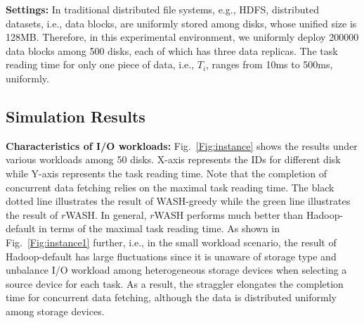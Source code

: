\documentclass[conference]{IEEEtran}
\begin{document}

\textbf{Settings:}
In traditional distributed file systems, e.g., HDFS\cite{b19}, distributed datasets, i.e., data blocks, are uniformly stored among disks, whose unified size is 128MB. Therefore, in this experimental environment, we uniformly deploy 200000 data blocks among 500 disks, each of which has three data replicas. The task reading time for only one piece of data, i.e., $T_i$, ranges from 10ms to 500ms, uniformly. 



\subsection{Simulation Results}

\textbf{Characteristics of I/O workloads:} Fig.~\ref{Fig:instance} shows the results under various workloads among 50 disks. X-axis represents the IDs for different disk while Y-axis represents the task reading time. Note that the completion of concurrent data fetching relies on the maximal task reading time. The black dotted line illustrates the result of WASH-greedy while the green line illustrates the result of $r$WASH. In general, $r$WASH performs much better than Hadoop-default in terms of the maximal task reading time. As shown in Fig.~\ref{Fig:instance1} further, i.e., in the small workload scenario, the result of Hadoop-default has large fluctuations since it is unaware of storage type and unbalance I/O workload among heterogeneous storage devices when selecting a source device for each task. As a result, the straggler elongates the completion time for concurrent data fetching, although the data is distributed uniformly among storage devices.
\end{document}
